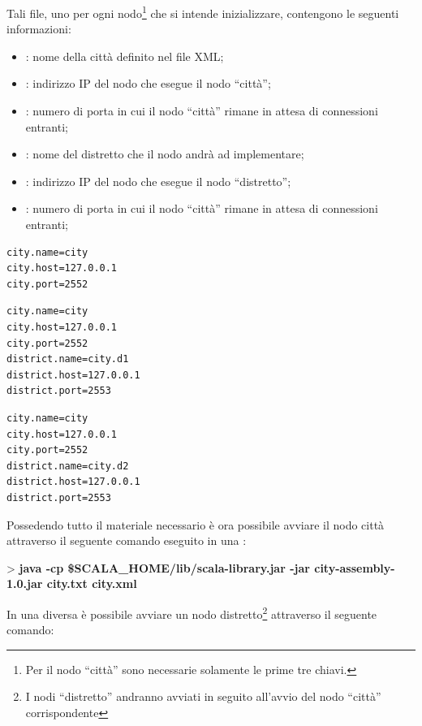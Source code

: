 Tali file, uno per ogni nodo\footnote{Per il nodo ``città'' sono necessarie solamente le prime tre chiavi.} che si intende inizializzare, contengono le seguenti informazioni:

\begin{itemize}
\item{: nome della città definito nel file XML;}
\item{: indirizzo IP del nodo che esegue il nodo ``città'';}
\item{: numero di porta in cui il nodo ``città'' rimane in attesa di connessioni entranti;}
\item{: nome del distretto che il nodo andrà ad implementare;}
\item{: indirizzo IP del nodo che esegue il nodo ``distretto'';}
\item{: numero di porta in cui il nodo ``città'' rimane in attesa di connessioni entranti;}
\end{itemize}

\begin{lstlisting}[frame=single, caption={configurazioni per il nodo città}]
city.name=city
city.host=127.0.0.1
city.port=2552
\end{lstlisting}

\begin{lstlisting}[frame=single, caption={configurazioni per il nodo distretto d1}]
city.name=city
city.host=127.0.0.1
city.port=2552
district.name=city.d1
district.host=127.0.0.1
district.port=2553
\end{lstlisting}

\begin{lstlisting}[frame=single, caption={configurazioni per il nodo distretto d2}]
city.name=city
city.host=127.0.0.1
city.port=2552
district.name=city.d2
district.host=127.0.0.1
district.port=2553
\end{lstlisting}

Possedendo tutto il materiale necessario è ora possibile avviare il nodo città attraverso il seguente comando eseguito in una :

> \textbf{java -cp \$SCALA\_HOME/lib/scala-library.jar -jar city-assembly-1.0.jar city.txt city.xml}

In una diversa  è possibile avviare un nodo distretto\footnote{I nodi ``distretto'' andranno avviati in seguito all'avvio del nodo ``città'' corrispondente} attraverso il seguente comando:

